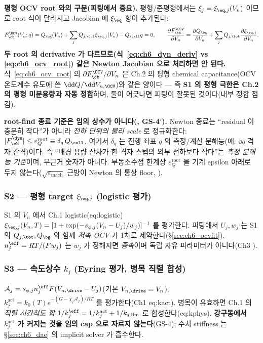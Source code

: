 \textbf{평형 OCV root 와의 구분(피팅에서 중요).} 평형/준평형에서는 $\xi_j=\xi_{\eq,j}(V_n)$ 이므로 root 식이
달라지고 Jacobian 에 $\xi_{\eq}$ 항이 추가된다:
\begin{equation}
F_\cb^\OCV(V_n;q)=Q_\bg(V_n)+\sum_j Q_{j,\tot}\xi_{\eq,j}(V_n)-Q_\cell q=0,\qquad
\frac{\partial F_\cb^\OCV}{\partial V_n}=\frac{\partial Q_\bg}{\partial V_n}+\sum_j Q_{j,\tot}\frac{\partial\xi_{\eq,j}}{\partial V_n}.
\label{eq:ch6_ocv_root}
\end{equation}
\textbf{두 root 의 derivative 가 다르므로(식~\eqref{eq:ch6_dyn_deriv} vs \eqref{eq:ch6_ocv_root}) 같은 Newton
Jacobian 으로 처리하면 안 된다.} 식~\eqref{eq:ch6_ocv_root} 의 $\partial F_\cb^\OCV/\partial V_n$ 은 Ch.2 의
평형 chemical capacitance(OCV 온도계수 유도에 쓴 $\dd Q/\dd V_{n,\OCV}$)와 같은 양이다 — 즉 \textbf{S1 의
평형 극한은 Ch.2 의 평형 미분용량과 자동 정합}하며, 둘이 어긋나면 피팅이 잘못된 것이다(내부 정합 점검).
\begin{verifybox}
\textbf{root-find 종료 기준은 임의 상수가 아니다(, GS-4$'$).} Newton 종료는 ``residual 이 충분히 작다''가
아니라 \emph{전하 단위의 물리 scale} 로 정규화한다: $|F_\cb^\dyn|\le\varepsilon_Q^{\mathrm{root}}\equiv
\delta_q\,Q_\cell$, 여기서 $\delta_q$ 는 진행 좌표 $q$ 의 측정/계산 분해능(예: $\dd q$ 격자 간격)이다. 즉 ``배경
용량 잔차가 한 격자 스텝의 외부 전하보다 작다''는 \emph{측정 분해능 기준}이며, 무근거 숫자가 아니다. 부동소수점
한계상 $\varepsilon_Q^{\mathrm{root}}$ 을 기계 epsilon 아래로 두지 않는다($\sqrt{\varepsilon_{\mathrm{mach}}}$
근방이 Newton 의 통상 floor, \cite{brenan1996}).
\end{verifybox}

\subsubsection{S2 — 평형 target $\xi_{\eq,j}$ (logistic 평가)}\label{sec:ch6_S2}
S1 의 $V_n$ 에서 Ch.1 logistic(eq:logistic) $\xi_{\eq,j}(V_n,T)=[1+\exp(-s_{\phi,j}(V_n-U_j)/w_j)]^{-1}$ 를 평가한다.
피팅에서 $U_j,w_j$ 는 S1 의 $Q_{j,\tot},Q_\bg$ 와 함께 \emph{저속 OCV} 가 1차로 제약한다(\S\ref{sec:ch6_ocvfit}).
$n_j^{\eff}=RT/(Fw_j)$ 는 $w_j$ 가 정해지면 \emph{종속}이며 독립 자유 파라미터가 아니다(Ch3 ).

\subsubsection{S3 — 속도상수 $k_j$ (Eyring 평가, 병목 직렬 합성)}\label{sec:ch6_S3}
$\mathcal A_j=s_{\phi,j}n_j^{\eff}F(V_{n,\drive}-U_j)$(기본 $V_{n,\drive}=V_n$), $k_j^{\mathrm{act}}=k_0(T)
e^{-(G-\chi_j\mathcal A_j)/RT}$ 를 평가한다(Ch1 eq:kact). 병목이 유효하면 Ch.1 의 \emph{직렬 시간척도 합}
$1/k_j^{\eff}=1/k_j^{\mathrm{act}}+1/k_{j,\lim}$ 로 합성한다(eq:kphys). \textbf{강구동에서 $k_j^{\mathrm{act}}$ 가
커지는 것을 임의 cap 으로 자르지 않는다}(GS-4); 수치 stiffness 는 \S\ref{sec:ch6_dae} 의 implicit solver 가
흡수한다.

